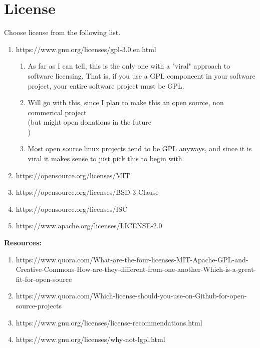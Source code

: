 \section{License}


Choose license from the following list.




\begin{enumerate}
	\item https://www.gnu.org/licenses/gpl-3.0.en.html
	\begin{enumerate}
		\item As far as I can tell, this is the only one with a "viral" approach to software licensing. That is, if you use a GPL componeent in your software project, your entire software project must be GPL.
		\item Will go with this, since I plan to make this an open source, non commerical project \\(but might open donations in the future\\)
		\item Most open source linux projects tend to be GPL anyways, and since it is viral it makes sense to just pick this to begin with.
	\end{enumerate}
	\item https://opensource.org/licenses/MIT
	\item https://opensource.org/licenses/BSD-3-Clause
	\item https://opensource.org/licenses/ISC
	\item https://www.apache.org/licenses/LICENSE-2.0
\end{enumerate}


\textbf{Resources:}
\begin{enumerate}
	\item https://www.quora.com/What-are-the-four-licenses-MIT-Apache-GPL-and-Creative-Commons-How-are-they-different-from-one-another-Which-is-a-great-fit-for-open-source
	\item https://www.quora.com/Which-license-should-you-use-on-Github-for-open-source-projects
	\item https://www.gnu.org/licenses/license-recommendations.html
	\item https://www.gnu.org/licenses/why-not-lgpl.html
\end{enumerate}

